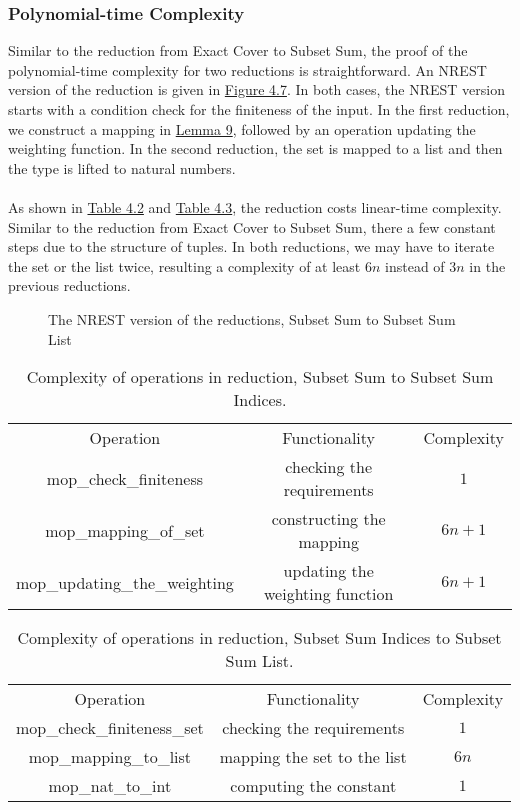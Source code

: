 \subsubsection*{Polynomial-time Complexity}
Similar to the reduction from Exact Cover to Subset Sum, the proof of the polynomial-time complexity for two reductions 
is straightforward. An NREST version of the reduction is given in \hyperref[fig:4.7]{Figure 4.7}.
In both cases, the NREST version starts with a condition check for the finiteness of the input. 
In the first reduction, we construct a mapping in \hyperref[lemma:9]{Lemma 9}, 
followed by an operation updating the weighting function. 
In the second reduction, the set is mapped to a list and then the type is lifted to natural numbers. \\\\
As shown in \hyperref[table:4.2]{Table 4.2} and \hyperref[table:4.3]{Table 4.3}, the reduction 
costs linear-time complexity. 
Similar to the reduction from Exact Cover to Subset Sum, there a few constant steps due to the structure of tuples. 
In both reductions, we may have to iterate the set or the list twice, resulting a complexity of at least $6n$ 
instead of $3n$ in the previous reductions.
\begin{figure}[!h]
\caption{The NREST version of the reductions, Subset Sum to Subset Sum List}
\label{fig:4.7}
\end{figure}
\begin{table}[!h]
    \centering 
    \begin{tabular}{| c | c | c |}
        \hline 
        Operation & Functionality & Complexity \\ 
        \hhline{|=|=|=|}
        mop\_check\_finiteness & checking the requirements & $1$ \\ 
        \hline 
        mop\_mapping\_of\_set & constructing the mapping & $6n + 1$ \\ 
        \hline 
        mop\_updating\_the\_weighting & updating the weighting function & $6n + 1$ \\ 
        \hline 
    \end{tabular}
    \caption{Complexity of operations in reduction, Subset Sum to Subset Sum Indices.}
    \label{table:4.2}
\end{table}
\begin{table}[!h]
    \centering 
    \begin{tabular}{| c | c | c |}
        \hline 
        Operation & Functionality & Complexity \\ 
        \hhline{|=|=|=|}
        mop\_check\_finiteness\_set & checking the requirements & $1$ \\ 
        \hline 
        mop\_mapping\_to\_list & mapping the set to the list & $6n$ \\ 
        \hline 
        mop\_nat\_to\_int & computing the constant & $1$ \\ 
        \hline 
    \end{tabular}
    \caption{Complexity of operations in reduction, Subset Sum Indices to Subset Sum List.}
    \label{table:4.3}
\end{table}

